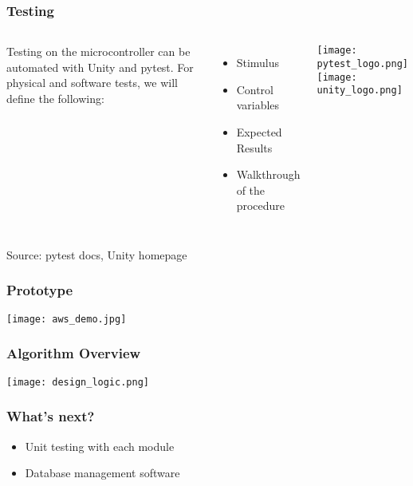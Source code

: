\documentclass{beamer}
\begin{document}
\begin{frame}
  \frametitle{Testing}

  \begin{columns}
    Testing on the microcontroller can be automated with Unity and pytest.
    \newline
    \newline
    For physical and software tests, we will define the following:
    \begin{itemize}
      \item Stimulus
      \item Control variables
      \item Expected Results
      \item Walkthrough of the procedure
    \end{itemize}

    \texttt{[image: pytest\_logo.png]} \\
    \texttt{[image: unity\_logo.png]}

  \end{columns}

  \hfill {\tiny Source: pytest docs, Unity homepage}
\end{frame}

\begin{frame}
  \frametitle{Prototype}

  \begin{center}
    \texttt{[image: aws\_demo.jpg]}
  \end{center}

\end{frame}

\begin{frame}
  \frametitle{Algorithm Overview}
  \texttt{[image: design\_logic.png]}
\end{frame}

\begin{frame}
  \frametitle{What's next?}
  \begin{itemize}
    \item Unit testing with each module
    \item Database management software
  \end{itemize}
\end{frame}
\end{document}
